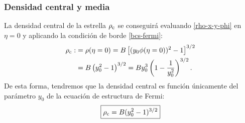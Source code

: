 \subsubsection{Densidad central y media}
La densidad central de la estrella $\rho_{\rm c}$ se conseguirá evaluando \eqref{rho-x-y-phi} en $\eta=0$ y aplicando la condición de borde \eqref{bcs-fermi}:
\begin{align}
 \rho_{\rm c}:&=\rho(\eta=0)=B\left[(y_0\phi(\eta=0))^2-1\right]^{3/2}\\
&=B\left(y_0^2-1\right)^{3/2}=By_0^3\left(1-\frac{1}{y_0^2}\right)^{3/2}.\label{ec-fermi-byrho1}
\end{align}
De esta forma, tendremos que la densidad central es función únicamente del parámetro $y_0$ de la ecuación de estructura de Fermi:
\begin{equation}\label{ec-fermi-byrho2}
 \boxed{\rho_{\rm c}=B(y_0^2-1)^{3/2}}
\end{equation}

